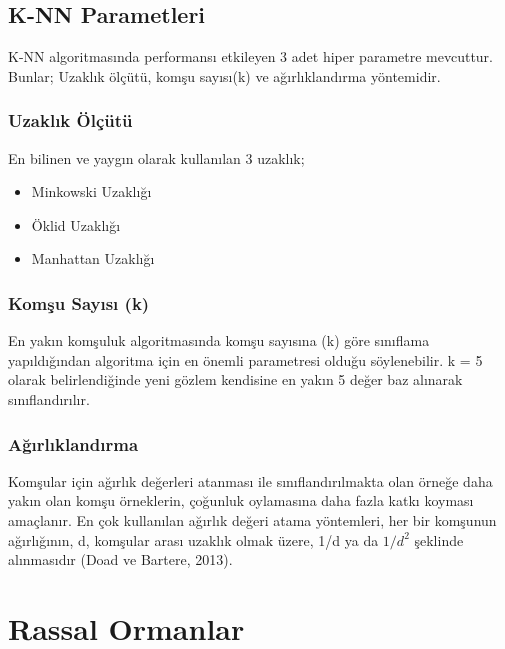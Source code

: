 \documentclass[12pt,twoside]{deuthesis}
\providecommand{\tightlist}{%
  \setlength{\itemsep}{0pt}\setlength{\parskip}{0pt}}
\begin{document}
\hypertarget{k-nn-parametleri}{%
\subsection{K-NN Parametleri}\label{k-nn-parametleri}}

K-NN algoritmasında performansı etkileyen 3 adet hiper parametre mevcuttur. Bunlar; Uzaklık ölçütü, komşu sayısı(k) ve ağırlıklandırma yöntemidir.

\hypertarget{uzaklux131k-uxf6luxe7uxfctuxfc}{%
\subsubsection{Uzaklık Ölçütü}\label{uzaklux131k-uxf6luxe7uxfctuxfc}}

En bilinen ve yaygın olarak kullanılan 3 uzaklık;
\begin{itemize}
\tightlist
\item
  Minkowski Uzaklığı\\
\item
  Öklid Uzaklığı\\
\item
  Manhattan Uzaklığı
\end{itemize}
\hypertarget{komux15fu-sayux131sux131-k}{%
\subsubsection{Komşu Sayısı (k)}\label{komux15fu-sayux131sux131-k}}

En yakın komşuluk algoritmasında komşu sayısına (k) göre sınıflama yapıldığından algoritma için en önemli parametresi olduğu söylenebilir. k = 5 olarak belirlendiğinde yeni gözlem kendisine en yakın 5 değer baz alınarak sınıflandırılır.

\hypertarget{aux11fux131rlux131klandux131rma}{%
\subsubsection{Ağırlıklandırma}\label{aux11fux131rlux131klandux131rma}}

Komşular için ağırlık değerleri atanması ile sınıflandırılmakta olan örneğe daha yakın olan komşu örneklerin, çoğunluk oylamasına daha fazla katkı koyması amaçlanır. En çok kullanılan ağırlık değeri atama yöntemleri, her bir komşunun ağırlığının, d, komşular arası uzaklık olmak üzere, 1/d ya da \(1/d^2\) şeklinde alınmasıdır (Doad ve Bartere, 2013).

\hypertarget{random_forest}{%
\section{Rassal Ormanlar}\label{random_forest}}
\end{document}
